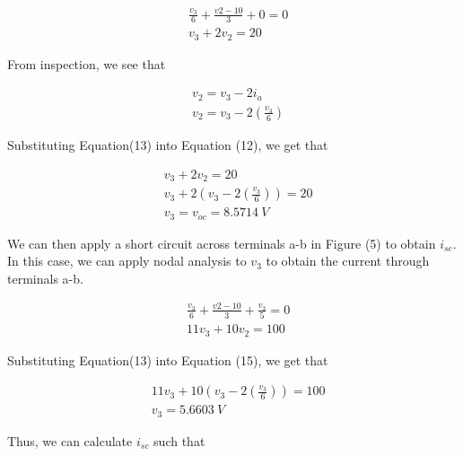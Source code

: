 \documentclass[12pt]{article}
\begin{document}
\begin{equation}
    \begin{split}
        &\frac{v_3}{6} + \frac{v2-10}{3} + 0 = 0 \\
        &v_3 + 2v_2 = 20
    \end{split}
\end{equation}

From inspection, we see that

\begin{equation}
    \begin{split}
        &v_2 = v_3 - 2i_a \\
        &v_2 = v_3 - 2\left(\frac{v_3}{6}\right)
    \end{split}
\end{equation}

Substituting Equation(13) into Equation (12), we get that

\begin{equation}
    \begin{split}
        &v_3 + 2v_2 = 20 \\
        &v_3 + 2\left(v_3 - 2\left(\frac{v_3}{6}\right)\right) = 20 \\
        &v_3 = v_{oc} = \SI{8.5714}{V}
    \end{split}
\end{equation}

We can then apply a short circuit across terminals a-b in Figure (5) to obtain $i_{sc}$. In this case, we can apply nodal analysis to $v_3$ to obtain the current through terminals a-b.

\begin{equation}
    \begin{split}
        &\frac{v_3}{6} + \frac{v2-10}{3} + \frac{v_3}{5} = 0 \\
        &11v_3 + 10v_2 = 100
    \end{split}
\end{equation}

Substituting Equation(13) into Equation (15), we get that

\begin{equation}
    \begin{split}
        &11v_3 + 10\left(v_3 - 2\left(\frac{v_3}{6}\right)\right) = 100 \\
        &v_3 = \SI{5.6603}{V}
    \end{split}
\end{equation}

Thus, we can calculate $i_{sc}$ such that
\end{document}
